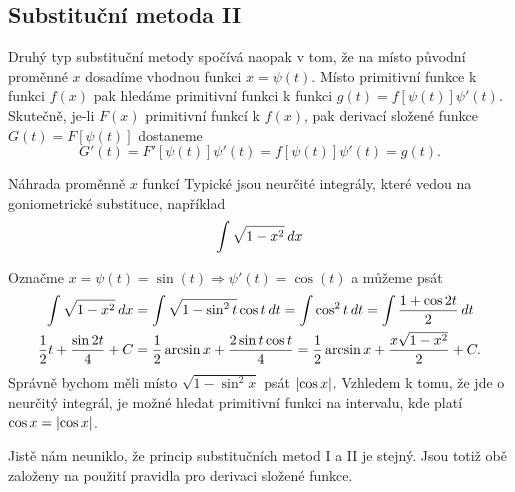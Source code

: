     \subsection{Substituční metoda II}
      Druhý typ substituční metody spočívá naopak v tom, že na místo původní proměnné \(x\) dosadíme vhodnou 
      funkci \(x = \psi(t)\). Místo primitivní funkce k funkci \(f(x)\) pak hledáme primitivní funkci k 
      funkci \(g(t) = f[\psi(t)]\psi'(t)\). Skutečně, je-li \(F(x)\) primitivní funkcí k \(f(x)\), pak 
      derivací složené funkce \(G(t) = F[\psi(t)]\) dostaneme
      \begin{equation*}
       G'(t) = F'[\psi(t)]\psi'(t) = f[\psi(t)]\psi'(t) = g(t).
      \end{equation*}
      \begin{example} Náhrada proměnně \(x\) funkcí
        Typické jsou neurčité integrály, které vedou na goniometrické substituce, například
        \[\int\sqrt{1-x^2}\hspace{2pt}dx\]
        
        Označme \(x=\psi(t)=\sin(t)  \Rightarrow \psi'(t)=\cos(t)\) a můžeme psát
        \begin{align*}
          \int\sqrt{1-x^2}\hspace{2pt}dx 
            &= \int\sqrt{1-\sin^2t}\cos t\hspace{2pt}dt = \int\cos^2 t \hspace{2pt}dt = \int\frac{1+\cos2t}{2}\hspace{2pt}dt\\
          \frac{1}{2}t+\frac{\sin2t}{4}+C
            &= \frac{1}{2}\arcsin x + \frac{2\sin t\cos t}{4} 
             = \frac{1}{2}\arcsin x + \frac{x\sqrt{1-x^2}}{2} + C.
        \end{align*}
        Správně bychom měli místo \(\sqrt{1 - \sin^2x}\) psát \(\left\lvert\cos x\right\rvert\). Vzhledem k tomu, že jde o 
        neurčitý integrál, je možné hledat primitivní funkci na intervalu, kde platí \(\cos x = \left\lvert\cos 
        x\right\rvert\).
      \end{example}
      Jistě nám neuniklo, že princip substitučních metod I a II je stejný. Jsou totiž obě založeny na použití 
      pravidla pro derivaci složené funkce.
  
